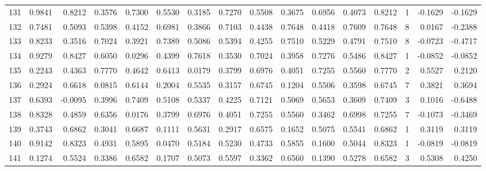 \begin{tabular}{lrrrrrrrrrrrrrrr}
131 &      0.9841 &  0.8212 &  0.3576 &  0.7300 &  0.5530 &  0.3185 &  0.7270 &  0.5508 &  0.3675 &  0.6956 &   0.4073 &     0.8212 &      1 &                   -0.1629 &                    -0.1629 \\
132 &      0.7481 &  0.5093 &  0.5398 &  0.4152 &  0.6981 &  0.3866 &  0.7103 &  0.4438 &  0.7648 &  0.4418 &   0.7609 &     0.7648 &      8 &                    0.0167 &                    -0.2388 \\
133 &      0.8233 &  0.3516 &  0.7024 &  0.3921 &  0.7389 &  0.5086 &  0.5394 &  0.4255 &  0.7510 &  0.5229 &   0.4791 &     0.7510 &      8 &                   -0.0723 &                    -0.4717 \\
134 &      0.9279 &  0.8427 &  0.6050 &  0.0296 &  0.4399 &  0.7618 &  0.3530 &  0.7024 &  0.3958 &  0.7276 &   0.5486 &     0.8427 &      1 &                   -0.0852 &                    -0.0852 \\
135 &      0.2243 &  0.4363 &  0.7770 &  0.4642 &  0.6413 &  0.0179 &  0.3799 &  0.6976 &  0.4051 &  0.7255 &   0.5560 &     0.7770 &      2 &                    0.5527 &                     0.2120 \\
136 &      0.2924 &  0.6618 &  0.0815 &  0.6144 &  0.2004 &  0.5535 &  0.3157 &  0.6745 &  0.1204 &  0.5506 &   0.3598 &     0.6745 &      7 &                    0.3821 &                     0.3694 \\
137 &      0.6393 & -0.0095 &  0.3996 &  0.7409 &  0.5108 &  0.5337 &  0.4225 &  0.7121 &  0.5069 &  0.5653 &   0.3609 &     0.7409 &      3 &                    0.1016 &                    -0.6488 \\
138 &      0.8328 &  0.4859 &  0.6356 &  0.0176 &  0.3799 &  0.6976 &  0.4051 &  0.7255 &  0.5560 &  0.3462 &   0.6998 &     0.7255 &      7 &                   -0.1073 &                    -0.3469 \\
139 &      0.3743 &  0.6862 &  0.3041 &  0.6687 &  0.1111 &  0.5631 &  0.2917 &  0.6575 &  0.1652 &  0.5075 &   0.5541 &     0.6862 &      1 &                    0.3119 &                     0.3119 \\
140 &      0.9142 &  0.8323 &  0.4931 &  0.5895 &  0.0470 &  0.5184 &  0.5230 &  0.4733 &  0.5855 &  0.1600 &   0.5044 &     0.8323 &      1 &                   -0.0819 &                    -0.0819 \\
141 &      0.1274 &  0.5524 &  0.3386 &  0.6582 &  0.1707 &  0.5073 &  0.5597 &  0.3362 &  0.6560 &  0.1390 &   0.5278 &     0.6582 &      3 &                    0.5308 &                     0.4250 \\

\end{tabular}

